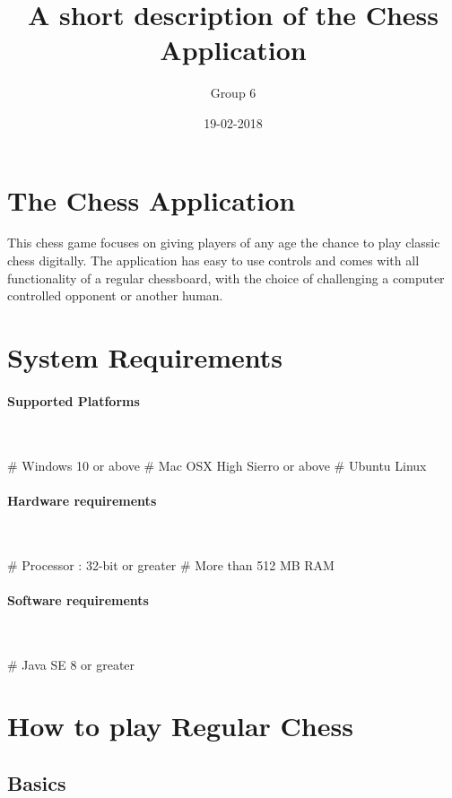 \documentclass{article}
\title{A short description of the Chess Application}
\author{Group 6}
\date{19-02-2018}
\begin{document}
\maketitle

\section*{The Chess Application}

This chess game focuses on giving players of any age the chance to play classic chess digitally. The application has easy to use controls and comes with all functionality of a regular chessboard, with the choice of challenging a computer controlled opponent or another human.

\section*{System Requirements}
\paragraph{Supported Platforms}\mbox{}\\
\begin{easylist}[itemize]
    # Windows 10 or above
    # Mac OSX High Sierro or above
    # Ubuntu Linux
\end{easylist}
\paragraph{Hardware requirements}\mbox{}\\
\begin{easylist}[itemize]
    # Processor : 32-bit or greater
    # More than 512 MB RAM
\end{easylist}
\paragraph{Software requirements}\mbox{}\\
\begin{easylist}[itemize]
    # Java SE 8 or greater
\end{easylist}

\newpage

\section*{How to play Regular Chess}
\subsection*{Basics}
\end{document}
